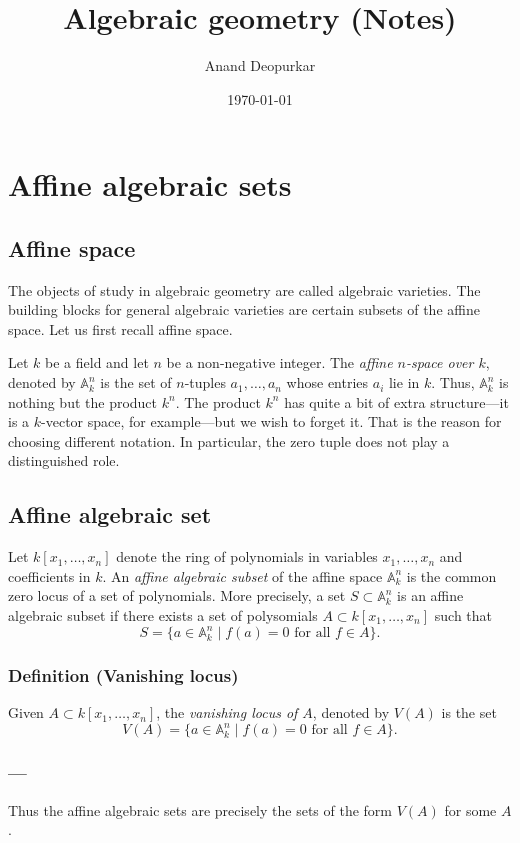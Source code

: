 \documentclass[11pt]{article}
\author{Anand Deopurkar}
\date{\today}
\title{Algebraic geometry (Notes)}
\begin{document}
\maketitle

\section{Affine algebraic sets}
\label{sec:org73f94fe}
\subsection{Affine space}
\label{sec:org3d3238e}
The objects of study in algebraic geometry are called algebraic varieties.
The building blocks for general algebraic varieties are certain subsets of the affine space.
Let us first recall affine space.

Let \(k\) be a field and let \(n\) be a non-negative integer.
The \emph{affine \(n\)-space over \(k\)}, denoted by \(\mathbb A^n_k\) is the set of \(n\)-tuples \(a_1,\dots, a_n\) whose entries \(a_i\) lie in \(k\).
Thus, \(\mathbb A^n_k\) is nothing but the product \(k^n\).
The product \(k^n\) has quite a bit of extra structure---it is a \(k\)-vector space, for example---but we wish to forget it.
That is the reason for choosing different notation.
In particular, the zero tuple does not play a distinguished role.

\subsection{Affine algebraic set}
\label{sec:org601dbca}
Let \(k[x_1,\dots,x_n]\) denote the ring of polynomials in variables \(x_1, \dots, x_n\) and coefficients in \(k\).
An \emph{affine algebraic subset} of the affine space \(\mathbb A^n_k\) is the common zero locus of a set of polynomials.
More precisely, a set \(S \subset \mathbb A^n_k\) is an affine algebraic subset if there exists a set of polysomials \(A \subset k[x_1,\dots,x_n]\) such that
\[ S = \{a \in \mathbb A^n_k \mid f(a) = 0 \text{ for all } f \in A\}.\]
\subsubsection{Definition (Vanishing locus)}
\label{sec:org50df409}
Given \(A \subset k[x_1,\dots,x_n]\), the \emph{vanishing locus of \(A\)}, denoted by \(V(A)\) is the set 
\[ V(A) = \{a \in \mathbb A^n_k \mid f(a) = 0 \text{ for all } f \in A\}.\]

\subsubsection*{---}
\label{sec:orga964f95}
Thus the affine algebraic sets are precisely the sets of the form \(V(A)\) for some \(A\).
\end{document}
